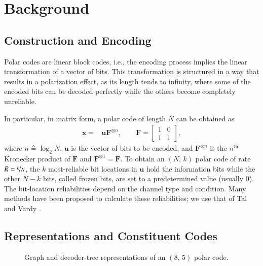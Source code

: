 \documentclass[conference]{IEEEtran}
\newcommand{\mvec}[1]{\bm{#1}}
\begin{document}
\section{Background}
\label{sec:bg}
\subsection{Construction and Encoding}
Polar codes are linear block codes, i.e., the encoding process implies the linear transformation of a vector of bits. This transformation is structured in a way that results in a polarization effect, as its length tends to infinity, where some of the encoded bits can be decoded perfectly while the others become completely unreliable.

In particular, in matrix form, a polar code of length $N$ can be obtained as
\begin{align}
  \label{eq:encoding}
	\mvec{x} = & \mvec{u}\mvec{F}^{\otimes n},	\qquad \mvec{F} = \begin{bmatrix} 1 & 0 \\ 1 & 1 \end{bmatrix},
\end{align}
where $n \triangleq \log _2 N$, $\mvec{u}$ is the vector of bits to be encoded, and $\mvec{F}^{\otimes n}$ is the $n^{\text{th}}$ Kronecker product of $\mvec{F}$ and $\mvec{F}^{\otimes 1}=\mvec{F}$. To obtain an $(N,\,k)$ polar code of rate $R=\nicefrac{k}{N}$, the $k$ most-reliable bit locations in $\mvec{u}$ hold the information bits while the other $N-k$ bits, called frozen bits, are set to a predetermined value (usually 0). The bit-location reliabilities depend on the channel type and condition. Many methods have been proposed to calculate these reliabilities; we use that of Tal and Vardy \cite{Tal2011a}.

\subsection{Representations and Constituent Codes}

\begin{figure}[t]
  \begin{minipage}{0.55\columnwidth}
    \centering
    \subfloat[Graph]{\label{fig:pc8}\hspace{-15pt}\resizebox{1.15\columnwidth}{!}{}}
  \end{minipage}%
  \begin{minipage}{0.45\columnwidth}
    \centering
    \vspace{-2pt}
  \end{minipage}
  \caption{Graph and decoder-tree representations of an $(8,\,5)$ polar code.}
\end{figure}
\end{document}
